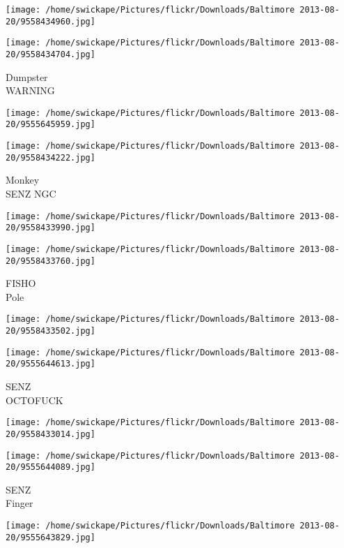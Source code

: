\documentclass[10pt,letterpaper]{article}
\begin{document}
\texttt{[image: /home/swickape/Pictures/flickr/Downloads/Baltimore 2013-08-20/9558434960.jpg]}

\vspace{0.25in}
\texttt{[image: /home/swickape/Pictures/flickr/Downloads/Baltimore 2013-08-20/9558434704.jpg]}

Dumpster\\
WARNING\\
\pagebreak

\texttt{[image: /home/swickape/Pictures/flickr/Downloads/Baltimore 2013-08-20/9555645959.jpg]}

\vspace{0.25in}
\texttt{[image: /home/swickape/Pictures/flickr/Downloads/Baltimore 2013-08-20/9558434222.jpg]}

Monkey\\
SENZ NGC\\
\pagebreak

\texttt{[image: /home/swickape/Pictures/flickr/Downloads/Baltimore 2013-08-20/9558433990.jpg]}

\vspace{0.25in}
\texttt{[image: /home/swickape/Pictures/flickr/Downloads/Baltimore 2013-08-20/9558433760.jpg]}

FISHO\\
Pole\\
\pagebreak

\texttt{[image: /home/swickape/Pictures/flickr/Downloads/Baltimore 2013-08-20/9558433502.jpg]}

\vspace{0.25in}
\texttt{[image: /home/swickape/Pictures/flickr/Downloads/Baltimore 2013-08-20/9555644613.jpg]}

SENZ\\
OCTOFUCK\\
\pagebreak

\texttt{[image: /home/swickape/Pictures/flickr/Downloads/Baltimore 2013-08-20/9558433014.jpg]}

\vspace{0.25in}
\texttt{[image: /home/swickape/Pictures/flickr/Downloads/Baltimore 2013-08-20/9555644089.jpg]}

SENZ\\
Finger\\
\pagebreak

\texttt{[image: /home/swickape/Pictures/flickr/Downloads/Baltimore 2013-08-20/9555643829.jpg]}
\end{document}
